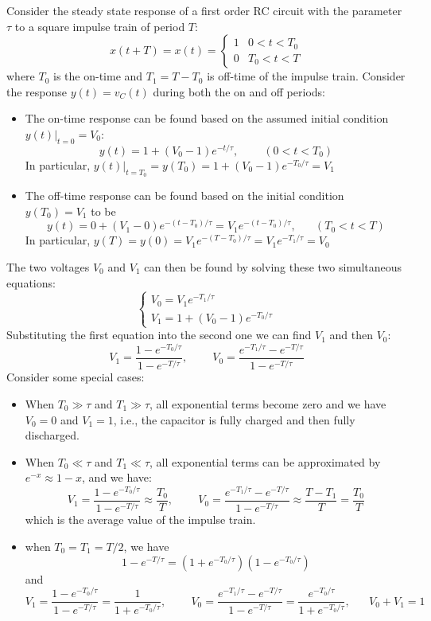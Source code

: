 Consider the steady state response of a first order RC circuit with the
parameter $\tau$ to a square impulse train of period $T$:
\[
x(t+T)=x(t)=\left\{ \begin{array}{cl}1&0<t<T_0\\0&T_0<t<T\end{array}\right.
\]
where $T_0$ is the on-time and $T_1=T-T_0$ is off-time of the impulse train.
Consider the response $y(t)=v_C(t)$ during both the on and off periods:
\begin{itemize}
\item The on-time response can be found based on the assumed initial condition 
  $y(t)\big|_{t=0}=V_0$:
  \[ y(t)=1+(V_0-1)e^{-t/\tau},\;\;\;\;\;\;\;\;(0<t<T_0) \]
  In particular, $y(t)\big|_{t=T_0}=y(T_0)=1+(V_0-1)e^{-T_0/\tau}=V_1$  
\item The off-time response can be found based on the initial condition
  $y(T_0)=V_1$ to be
  \[ 
  y(t)=0+(V_1-0)e^{-(t-T_0)/\tau}=V_1 e^{-(t-T_0)/\tau},\;\;\;\;\;\;(T_0<t<T) 
  \]
  In particular, $y(T)=y(0)=V_1 e^{-(T-T_0)/\tau}=V_1 e^{-T_1/\tau}=V_0$
\end{itemize}
The two voltages $V_0$ and $V_1$ can then be found by solving these two 
simultaneous equations:
\[ 
\left\{\begin{array}{l} V_0=V_1 e^{-T_1/\tau}\\V_1=1+(V_0-1)e^{-T_0/\tau}\end{array}\right. 
\]
Substituting the first equation into the second one we can find $V_1$ and then
$V_0$:
\[
V_1=\frac{1-e^{-T_0/\tau}}{1-e^{-T/\tau}},\;\;\;\;\;\;\;\;
V_0=\frac{e^{-T_1/\tau}-e^{-T/\tau}}{1-e^{-T/\tau}} 
\]
Consider some special cases:
\begin{itemize}
\item When $T_0\gg\tau$ and $T_1\gg\tau$, all exponential terms become zero 
  and we have $V_0=0$ and $V_1=1$, i.e., the capacitor is fully charged and
  then fully discharged.
\item When $T_0\ll\tau$ and $T_1\ll\tau$, all exponential terms can be 
  approximated by $e^{-x}\approx 1-x$, and we have:
  \[ V_1=\frac{1-e^{-T_0/\tau}}{1-e^{-T/\tau}}\approx\frac{T_0}{T},  \;\;\;\;\;\;\;\;
  V_0=\frac{e^{-T_1/\tau}-e^{-T/\tau}}{1-e^{-T/\tau}}\approx\frac{T-T_1}{T}=\frac{T_0}{T} 
  \]
  which is the average value of the impulse train.

\item when $T_0=T_1=T/2$, we have
  \[ 
  1-e^{-T/\tau}=(1+e^{-T_0/\tau})(1-e^{-T_0/\tau}) 
  \]
  and
  \[ 
  V_1=\frac{1-e^{-T_0/\tau}}{1-e^{-T/\tau}}=\frac{1}{1+e^{-T_0/\tau}},
  \;\;\;\;\;\;\;\;
  V_0=\frac{e^{-T_1/\tau}-e^{-T/\tau}}{1-e^{-T/\tau}}=\frac{e^{-T_0/\tau}}{1+e^{-T_0/\tau}},
  \;\;\;\;\;\;V_0+V_1=1 
  \]
\end{itemize}

